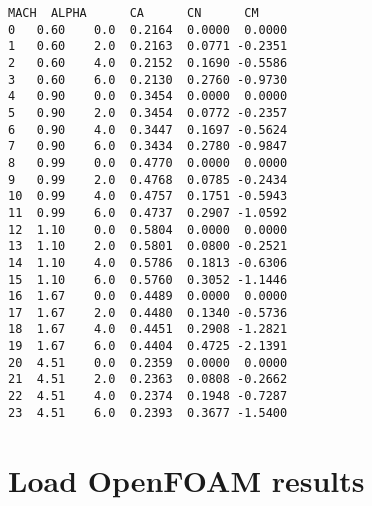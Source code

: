 \documentclass[11pt]{article}
\makeatletter
\newcommand{\boxspacing}{\kern\kvtcb@left@rule\kern\kvtcb@boxsep}
\newcommand{\prompt}[4]{
        {\ttfamily\llap{{\color{#2}[#3]:\hspace{3pt}#4}}\vspace{-\baselineskip}}
    }
\makeatother
\begin{document}
            \begin{tcolorbox}[breakable, size=fbox, boxrule=.5pt, pad at break*=1mm, opacityfill=0]
\prompt{Out}{outcolor}{200}{\boxspacing}
\begin{Verbatim}[commandchars=\\\{\}]
    MACH  ALPHA      CA      CN      CM
0   0.60    0.0  0.2164  0.0000  0.0000
1   0.60    2.0  0.2163  0.0771 -0.2351
2   0.60    4.0  0.2152  0.1690 -0.5586
3   0.60    6.0  0.2130  0.2760 -0.9730
4   0.90    0.0  0.3454  0.0000  0.0000
5   0.90    2.0  0.3454  0.0772 -0.2357
6   0.90    4.0  0.3447  0.1697 -0.5624
7   0.90    6.0  0.3434  0.2780 -0.9847
8   0.99    0.0  0.4770  0.0000  0.0000
9   0.99    2.0  0.4768  0.0785 -0.2434
10  0.99    4.0  0.4757  0.1751 -0.5943
11  0.99    6.0  0.4737  0.2907 -1.0592
12  1.10    0.0  0.5804  0.0000  0.0000
13  1.10    2.0  0.5801  0.0800 -0.2521
14  1.10    4.0  0.5786  0.1813 -0.6306
15  1.10    6.0  0.5760  0.3052 -1.1446
16  1.67    0.0  0.4489  0.0000  0.0000
17  1.67    2.0  0.4480  0.1340 -0.5736
18  1.67    4.0  0.4451  0.2908 -1.2821
19  1.67    6.0  0.4404  0.4725 -2.1391
20  4.51    0.0  0.2359  0.0000  0.0000
21  4.51    2.0  0.2363  0.0808 -0.2662
22  4.51    4.0  0.2374  0.1948 -0.7287
23  4.51    6.0  0.2393  0.3677 -1.5400
\end{Verbatim}
\end{tcolorbox}
        
    \hypertarget{load-openfoam-results}{%
\section{Load OpenFOAM results}\label{load-openfoam-results}}
\end{document}
